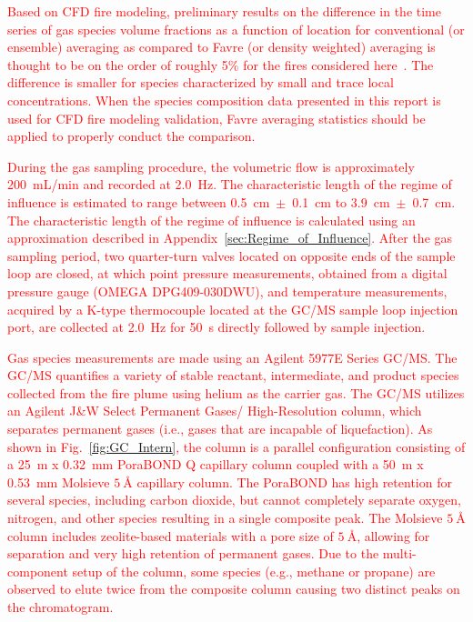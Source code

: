 \documentclass[12pt]{article}
\begin{document}
\textcolor{red}{Based on CFD fire modeling, preliminary results on the difference in the time series of gas species volume fractions as a function of location for conventional (or ensemble) averaging as compared to Favre (or density weighted) averaging is thought to be on the order of roughly 5\% for the fires considered here~\cite{McDermott_2021}. The difference is smaller for species characterized by small and trace local concentrations. When the species composition data presented in this report is used for CFD fire modeling validation, Favre averaging statistics should be applied to properly conduct the comparison.}

\textcolor{red}{During the gas sampling procedure, the volumetric flow is approximately 200~mL/min and recorded at \SI{2.0}{\hertz}. The characteristic length of the regime of influence is estimated to range between 0.5~cm~$\pm$~0.1~cm to 3.9~cm~$\pm$~0.7~cm. The characteristic length of the regime of influence is calculated using an approximation described in Appendix~\ref{sec:Regime_of_Influence}. After the gas sampling period, two quarter-turn valves located on opposite ends of the sample loop are closed, at which point pressure measurements, obtained from a digital pressure gauge (OMEGA DPG409-030DWU), and temperature measurements, acquired by a K-type thermocouple located at the GC/MS sample loop injection port, are collected at \SI{2.0}{\hertz} for \SI{50}{s} directly followed by sample injection.}

\textcolor{red}{Gas species measurements are made using an Agilent 5977E Series GC/MS. The GC/MS quantifies a variety of stable reactant, intermediate, and product species collected from the fire plume using helium as the carrier gas. The GC/MS utilizes an Agilent J\&W Select Permanent Gases/ High-Resolution column, which separates permanent gases (i.e., gases that are incapable of liquefaction). As shown in Fig.~\ref{fig:GC_Intern}, the column is a parallel configuration consisting of a 25~m x 0.32~mm PoraBOND Q capillary column coupled with a 50~m x 0.53~mm Molsieve $\SI{5}{\angstrom}$ capillary column. The PoraBOND has high retention for several species, including carbon dioxide, but cannot completely separate oxygen, nitrogen, and other species resulting in a single composite peak. The Molsieve $\SI{5}{\angstrom}$ column includes zeolite-based materials with a pore size of $\SI{5}{\angstrom}$, allowing for separation and very high retention of permanent gases. Due to the multi-component setup of the column, some species (e.g., methane or propane) are observed to elute twice from the composite column causing two distinct peaks on the chromatogram.}
\end{document}
